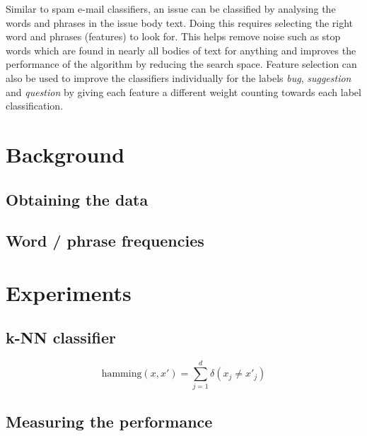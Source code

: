 Similar to spam e-mail classifiers, an issue can be classified by analysing the words and phrases in the issue body text. Doing
this requires selecting the right word and phrases (features) to look for. This helps remove noise such as stop words which are
found in nearly all bodies of text for anything and improves the performance of the algorithm by reducing the search space.
Feature selection can also be used to improve the classifiers individually for the labels \textit{bug}, \textit{suggestion} and
\textit{question} by giving each feature a different weight counting towards each label classification.

\section{Background}
\subsection{Obtaining the data}

\subsection{Word / phrase frequencies}
\todo{}

\section{Experiments}
\subsection{k-NN classifier}
\todo{}

\begin{equation}
\mathrm{hamming}(x,x') = \sum^d_{j=1} \delta (x_{j} \neq x'_{j})
\end{equation}

\subsection{Measuring the performance}

